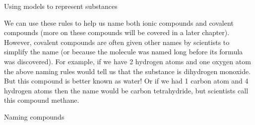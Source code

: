 \begin{activity}{Using models to represent substances}
	\par
\label{m38708*eip-163}We can use these rules to help us name both ionic compounds and covalent compounds (more on these compounds will be covered in a later chapter). However, covalent compounds are often given other names by scientists to simplify the name (or because the molecule was named long before its formula was discovered). For example, if we have 2 hydrogen atoms and one oxygen atom the above naming rules would tell us that the substance is dihydrogen monoxide. But this compound is better known as water! Or if we had 1 carbon atom and 4 hydrogen atoms then the name would be carbon tetrahydride, but scientists call this compound methane.  \par \label{m38708*eip-254}\vspace{.5cm} 
      \begin{wex}{Naming compounds}
{\label{m38708*eip-671}
  \label{m38708*eip-870}
}
\end{wex}
\end{activity}
